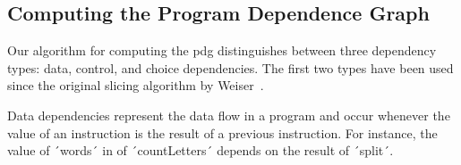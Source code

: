%
%
%
%
%

\subsection{Computing the Program Dependence Graph}

Our algorithm for computing the \ac{pdg} distinguishes between three dependency types: data, control, and choice dependencies.
The first two types have been used since the original slicing algorithm by Weiser~\cite{weiser_81_program_slicing}.

Data dependencies represent the data flow in a program and occur whenever the value of an instruction is the result of a previous instruction.
For instance, the value of ´words´ in  of ´countLetters´ depends on the result of ´split´.

